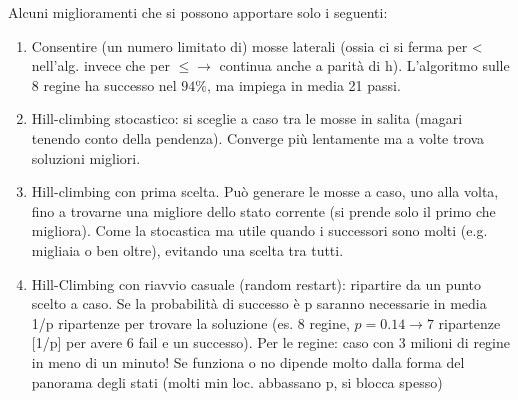 \hspace{-15pt}Alcuni miglioramenti che si possono apportare solo i seguenti:
\begin{enumerate}
    \item Consentire (un numero limitato di) mosse laterali (ossia ci si ferma per < nell’alg. invece che per $\leq \to$ continua anche a parità di h). L’algoritmo sulle 8 regine ha successo nel $94\%$, ma impiega in media 21 passi.
    \item Hill-climbing stocastico: si sceglie a caso tra le mosse in salita (magari tenendo conto della pendenza). Converge più lentamente ma a volte trova soluzioni migliori.
    \item Hill-climbing con prima scelta. Può generare le mosse a caso, uno alla volta, fino a trovarne una migliore dello stato corrente (si prende solo il primo che migliora). Come la stocastica ma utile quando i successori sono molti (e.g. migliaia o ben oltre), evitando una scelta tra tutti.
    \item Hill-Climbing con riavvio casuale (random restart): ripartire da un punto scelto a caso. Se la probabilità di successo è p saranno necessarie in
    media 1/p ripartenze per trovare la soluzione (es. 8 regine, $p=0.14 \to 7$ ripartenze [1/p] per avere 6 fail e un successo). 
    Per le regine: caso con 3 milioni di regine in meno di un minuto! Se funziona o no dipende molto dalla forma del panorama degli stati (molti min loc. abbassano p, si blocca spesso)
\end{enumerate}

